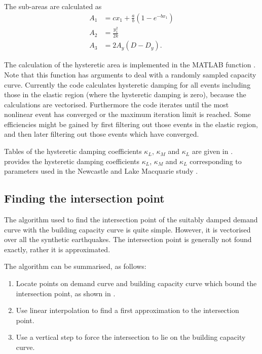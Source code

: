 The sub-areas are calculated as
\begin{align*}
 A_1 &= cx_1+\frac{a}{b}(1-e^{-bx_1})\\
 A_2 &= \frac{y_1^2}{2k}\\
 A_3 &= 2A_y(D-D_y).
\end{align*}

The calculation of the hysteretic area is implemented in the
MATLAB function . Note that this
function has arguments to deal with a randomly sampled capacity
curve. Currently the code calculates
hysteretic damping for all events including those in the elastic
region (where the hysteretic damping is zero), because the
calculations are vectorised. Furthermore the code iterates until
the most nonlinear event has converged or the maximum iteration
limit is reached. Some efficiencies might be gained by first
filtering out those events in the elastic region, and then later
filtering out those events which have converged.

Tables of the hysteretic damping coefficients $\kappa_L$,
$\kappa_M$ and $\kappa_L$ are given in .
 provides the hysteretic damping
coefficients $\kappa_L$, $\kappa_M$ and $\kappa_L$ corresponding
to parameters used in the Newcastle and Lake Macquarie study
\citep{dr_Fulford02a}.



\subsection{Finding the intersection point}

The algorithm used to find the intersection point of the suitably
damped demand curve with the building capacity
curve is quite simple. However, it is
vectorised over all the synthetic earthquakes. The intersection
point is generally not found exactly, rather it is approximated.

The algorithm can be summarised, as follows:
\begin{enumerate}
\item Locate points on demand curve and
building capacity curve which bound the
intersection point, as shown in .
\item Use linear interpolation to find a first approximation to
the
  intersection point.
\item Use a vertical step to force the intersection to lie on the
  building capacity curve.
\end{enumerate}


